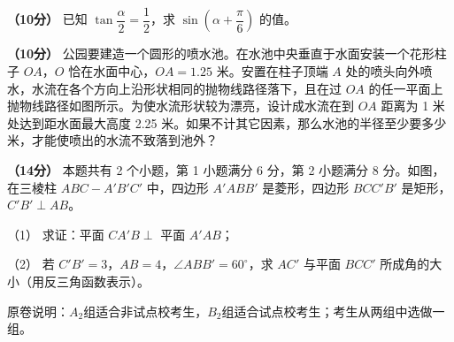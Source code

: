 \begin{question}
\textbf{（10分）} 已知 $\tan\dfrac\alpha2=\dfrac12$，求 $\sin\left(\alpha+\dfrac\pi6\right)$ 的值。

\Needspace{0.4\textheight}
\end{question}
\begin{question}
\textbf{（10分）} 公园要建造一个圆形的喷水池。在水池中央垂直于水面安装一个花形柱子 $OA$，$O$ 恰在水面中心，$OA=1.25$ 米。安置在柱子顶端 $A$ 处的喷头向外喷水，水流在各个方向上沿形状相同的抛物线路径落下，且在过 $OA$ 的任一平面上抛物线路径如图所示。为使水流形状较为漂亮，设计成水流在到 $OA$ 距离为 1 米处达到距水面最大高度 2.25 米。如果不计其它因素，那么水池的半径至少要多少米，才能使喷出的水流不致落到池外？
\nopagebreak[4]
\begin{center}\end{center}
\nopagebreak[4]
\Needspace{0.4\textheight}
\end{question}
\begin{question}
\textbf{（14分）} 本题共有 2 个小题，第 1 小题满分 6 分，第 2 小题满分 8 分。如图，在三棱柱 $ABC-A'B'C'$ 中，四边形 $A'ABB'$ 是菱形，四边形 $BCC'B'$ 是矩形，$C'B'\perp AB$。

（1） 求证：平面 $CA'B\perp$ 平面 $A'AB$；

（2） 若 $C'B'=3$，$AB=4$，$\angle ABB'=60^\circ$，求 $AC'$ 与平面 $BCC'$ 所成角的大小（用反三角函数表示）。
\nopagebreak[4]
\begin{center}\end{center}
\nopagebreak[4]
\end{question}

原卷说明：$A_2$组适合非试点校考生，$B_2$组适合试点校考生；考生从两组中选做一组。

